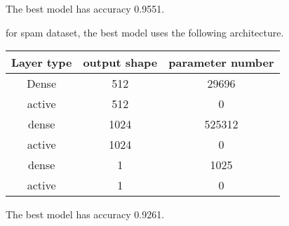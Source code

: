 \documentclass{article}
\begin{document}
The best model has accuracy 0.9551.

for spam dataset, the best model uses the following architecture.

\begin{center}
    \begin{tabular}{ ccc } 
        \hline
        Layer type & output shape & parameter number\\ \hline
        Dense & 512 & 29696 \\ 
        active & 512 & 0\\
        dense & 1024 & 525312\\
        active & 1024 & 0\\
        dense & 1 & 1025\\
        active & 1 & 0\\ \hline
    \end{tabular}
\end{center}

The best model has accuracy 0.9261.
\end{document}
